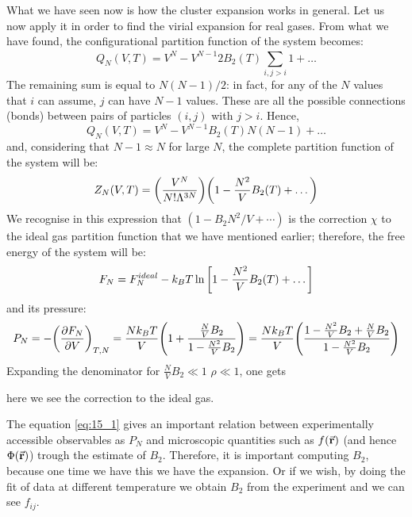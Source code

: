 \documentclass[../main/main.tex]{subfiles}
\begin{document}
What we have seen now is how the cluster expansion works in general. Let us now apply it in order to find the virial expansion for real gases. From what we have found, the configurational partition function of the system becomes:
\begin{equation*}
  Q_N (V,T) = V^N -  V^{N-1} 2 B_2 (T)  \sum_{i,j>i}^{} 1 + \dots
\end{equation*}
The remaining sum is equal to \( N(N-1)/2 \): in fact, for any of the \( N \) values that
\( i \) can assume,  \( j \)  can have \( N-1 \) values. These are all the possible connections (bonds) between pairs of particles \( (i,j) \) with \( j>i \).
Hence,
\begin{equation}
  Q_N (V,T) = V^N - V^{N-1}  B_2 (T)  N (N-1) + \dots
\end{equation}
and, considering that  \( N-1 \approx N \) for large \( N \), the complete partition function of the system will be:
\begin{equation}
  Z_N (V,T) = \qty(\frac{V^N}{N! \Lambda ^{3N}}) \qty(1- \frac{N^2}{V} B_2 (T)+ \dots)
\end{equation}
We recognise in this expression that \( (1-B_{2}N^{2}/V+\cdots ) \) is the correction \( \chi  \) to the ideal gas partition function that we have mentioned earlier; therefore, the free energy of the system will be:
\begin{equation}
  F_N = F_N^{ideal} - k_B T \ln{\qty[1-\frac{N^2}{V}B_2 (T)+ \dots] }
\end{equation}
and its pressure:
\begin{equation*}
  P_N = - \qty(\pdv{F_N}{V} )_{T,N} = \frac{N k_B T}{V} \qty(1+ \frac{\frac{N}{V}B_2}{1- \frac{N^2}{V}B_2})
  = \frac{N k_B T}{V} \qty(\frac{1 -\frac{N^2}{V} B_2 + \frac{N}{V} B_2 }{1- \frac{N^2}{V} B_2})
\end{equation*}
Expanding the denominator for \( \frac{N}{V} B_2 \ll 1 \) \( \rho \ll 1 \), one gets
here we see the correction to the ideal gas.
\begin{remark}
The equation \eqref{eq:15_1} gives an important relation between experimentally accessible observables as \( P_N \) and microscopic quantities such as \( f(\va{r}) \) (and hence \( \Phi (\va{r}) \)) trough the estimate of \( B_2 \).
Therefore, it is important computing \( B_2 \), because one time we have this we have the expansion. Or if we wish, by doing the fit of data at different temperature we obtain \( B_2 \) from the experiment and we can see \( f_{ij} \).
\end{remark}
\end{document}
